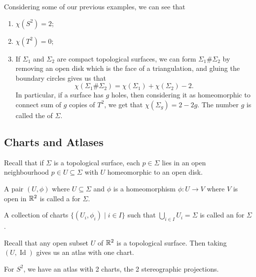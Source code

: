 \documentclass[a4paper]{scrartcl}
\begin{document}
\begin{example}
    Considering some of our previous examples, we can see that
    \begin{enumerate}[label=(\roman*)]
        \item $\chi(S^2) = 2$;
        \item $\chi(T^2) = 0$;
        \item If $\Sigma_1$ and $\Sigma_2$ are compact topological surfaces, we can form $\Sigma_1 \# \Sigma_2$ by removing an open disk which is the face of a triangulation, and gluing the boundary circles gives us that
        $$
        \chi(\Sigma_1 \# \Sigma_2) = \chi(\Sigma_1) + \chi(\Sigma_2) - 2.
        $$
        In particular, if a surface has $g$ holes, then considering it as homeomorphic to connect sum of $g$ copies of $T^2$, we get that $\chi(\Sigma_g) = 2 - 2g$. The number $g$ is called the  of $\Sigma$.
    \end{enumerate}
\end{example}

\subsection{Charts and Atlases}

Recall that if $\Sigma$ is a topological surface, each $p \in \Sigma$ lies in an open neighbourhood $p \in U \subseteq \Sigma$ with $U$ homeomorphic to an open disk.

\begin{definition}[Chart]
    A pair $(U, \phi)$ where $U \subseteq \Sigma$ and $\phi$ is a homeomorphism $\phi: U \rightarrow V$ where $V$ is open in $\mathbb{R}^2$ is called a  for $\Sigma$.
\end{definition}

\begin{definition}[Atlas]
    A collection of charts $\{(U_i, \phi_i) \mid i \in I\}$ such that $\bigcup_{i \in I} U_i = \Sigma$ is called an  for $\Sigma$.
\end{definition}

\begin{example}
    Recall that any open subset $U$ of $\mathbb{R}^2$ is a topological surface. Then taking $(U, \operatorname{Id})$ gives us an atlas with one chart. 
\end{example}

\begin{example}
    For $S^2$, we have an atlas with 2 charts, the 2 stereographic projections.
\end{example}
\end{document}
